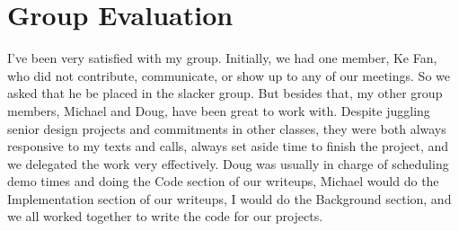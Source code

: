 \documentclass[letterpaper,10pt,titlepage]{article}
\newcommand{\tab}{\hspace*{2em}} %
\begin{document}
\newpage
\section{Group Evaluation}

\tab I've been very satisfied with my group. Initially, we had one member, Ke Fan, who did not contribute, communicate, or show up to any of our meetings. So we asked that he be placed in the slacker group. But besides that, my other group members, Michael and Doug, have been great to work with. Despite juggling senior design projects and commitments in other classes, they were both always responsive to my texts and calls, always set aside time to finish the project, and we delegated the work very effectively. Doug was usually in charge of scheduling demo times and doing the Code section of our writeups, Michael would do the Implementation section of our writeups, I would do the Background section, and we all worked together to write the code for our projects. 




%
\end{document}
